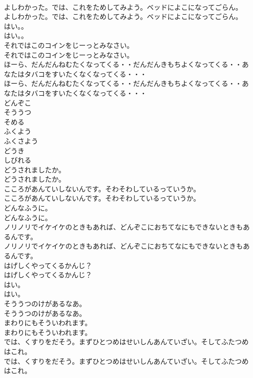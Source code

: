 \documentclass[8pt]{extreport}
\begin{document}
\begin{CJK}{UTF8}{min}
\\	よしわかった。では、これをためしてみよう。ベッドによこになってごらん。	
\\	よしわかった。では、これをためしてみよう。ベッドによこになってごらん。 
\\	はい。。	
\\	はい。。 
\\	それではこのコインをじーっとみなさい。	
\\	それではこのコインをじーっとみなさい。 
\\	ほーら、だんだんねむたくなってくる・・だんだんきもちよくなってくる・・あなたはタバコをすいたくなくなってくる・・・	
\\	ほーら、だんだんねむたくなってくる・・だんだんきもちよくなってくる・・あなたはタバコをすいたくなくなってくる・・・ 
\\	どんぞこ
\\	そううつ
\\	そめる
\\	ふくよう
\\	ふくさよう
\\	どうき
\\	しびれる
\\	どうされましたか。	
\\	どうされましたか。 
\\	こころがあんていしないんです。そわそわしているっていうか。	
\\	こころがあんていしないんです。そわそわしているっていうか。 
\\	どんなふうに。	
\\	どんなふうに。 
\\	ノリノリでイケイケのときもあれば、どんぞこにおちてなにもできないときもあるんです。	
\\	ノリノリでイケイケのときもあれば、どんぞこにおちてなにもできないときもあるんです。 
\\	はげしくやってくるかんじ？	
\\	はげしくやってくるかんじ？ 
\\	はい。	
\\	はい。 
\\	そううつのけがあるなあ。	
\\	そううつのけがあるなあ。 
\\	まわりにもそういわれます。	
\\	まわりにもそういわれます。 
\\	では、くすりをだそう。まずひとつめはせいしんあんていざい。そしてふたつめはこれ。	
\\	では、くすりをだそう。まずひとつめはせいしんあんていざい。そしてふたつめはこれ。 

\end{CJK}
\end{document}
